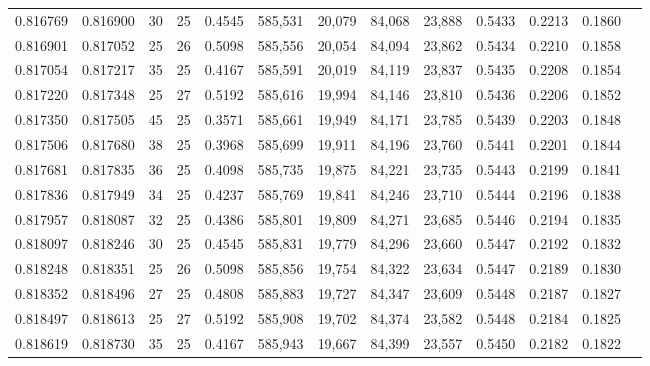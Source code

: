 \begin{tabular}{rrrrrrrrrrrrr}
0.816769 & 0.816900 &    30 &  25 &                                     0.4545 & 585,531 &  20,079 &  84,068 &  23,888 & 0.5433 & 0.2213 & 0.1860 \\
0.816901 & 0.817052 &    25 &  26 &                                     0.5098 & 585,556 &  20,054 &  84,094 &  23,862 & 0.5434 & 0.2210 & 0.1858 \\
0.817054 & 0.817217 &    35 &  25 &                                     0.4167 & 585,591 &  20,019 &  84,119 &  23,837 & 0.5435 & 0.2208 & 0.1854 \\
0.817220 & 0.817348 &    25 &  27 &                                     0.5192 & 585,616 &  19,994 &  84,146 &  23,810 & 0.5436 & 0.2206 & 0.1852 \\
0.817350 & 0.817505 &    45 &  25 &                                     0.3571 & 585,661 &  19,949 &  84,171 &  23,785 & 0.5439 & 0.2203 & 0.1848 \\
0.817506 & 0.817680 &    38 &  25 &                                     0.3968 & 585,699 &  19,911 &  84,196 &  23,760 & 0.5441 & 0.2201 & 0.1844 \\
0.817681 & 0.817835 &    36 &  25 &                                     0.4098 & 585,735 &  19,875 &  84,221 &  23,735 & 0.5443 & 0.2199 & 0.1841 \\
0.817836 & 0.817949 &    34 &  25 &                                     0.4237 & 585,769 &  19,841 &  84,246 &  23,710 & 0.5444 & 0.2196 & 0.1838 \\
0.817957 & 0.818087 &    32 &  25 &                                     0.4386 & 585,801 &  19,809 &  84,271 &  23,685 & 0.5446 & 0.2194 & 0.1835 \\
0.818097 & 0.818246 &    30 &  25 &                                     0.4545 & 585,831 &  19,779 &  84,296 &  23,660 & 0.5447 & 0.2192 & 0.1832 \\
0.818248 & 0.818351 &    25 &  26 &                                     0.5098 & 585,856 &  19,754 &  84,322 &  23,634 & 0.5447 & 0.2189 & 0.1830 \\
0.818352 & 0.818496 &    27 &  25 &                                     0.4808 & 585,883 &  19,727 &  84,347 &  23,609 & 0.5448 & 0.2187 & 0.1827 \\
0.818497 & 0.818613 &    25 &  27 &                                     0.5192 & 585,908 &  19,702 &  84,374 &  23,582 & 0.5448 & 0.2184 & 0.1825 \\
0.818619 & 0.818730 &    35 &  25 &                                     0.4167 & 585,943 &  19,667 &  84,399 &  23,557 & 0.5450 & 0.2182 & 0.1822 \\

\end{tabular}
